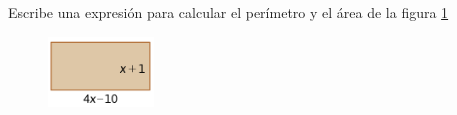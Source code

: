 Escribe una expresión para calcular el perímetro y el área de la figura \ref{fig:20230319044600}

\begin{figure}[H]
    \centering
    \includegraphics[width=0.25\textwidth]{../images/20230319044600}
    \caption{}
    \label{fig:20230319044600}
\end{figure}
